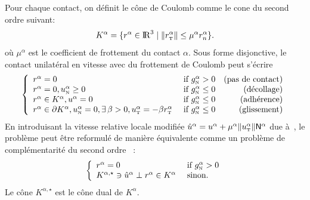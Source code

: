 \documentclass{CSMA2017}
\def\RR{\nbR}
\def\nbR{\ensuremath{\mathrm{I\!R}}} %
\def\n{{\hbox{\tiny{N}}}}
\def\t{{\hbox{\tiny{T}}}}
\begin{document}
Pour chaque contact, on définit le cône de Coulomb comme le cone du second ordre suivant:
\begin{equation}
  \label{eq:CoulombCone}
  K^\alpha = \{r^\alpha \in \RR^3 \mid \|r^\alpha_\t\| \leq \mu^\alpha r^\alpha_n\}.
\end{equation}
où $\mu^\alpha$ est le coefficient de frottement du contact $\alpha$. Sous forme disjonctive, le contact unilatéral en vitesse avec du frottement de Coulomb peut s'écrire
\begin{equation}
  \label{eq:contact-disjunctive}
  \left\{\begin{array}{llr}
      r^\alpha = 0  &\text{ if } g^\alpha_{\n} > 0  & \text{(pas de  contact)}\\
      r^\alpha = 0,  u^\alpha_\n \geq 0   &\text{ if } g^\alpha_{\n} \leq 0 & \text{(décollage)} \\
      r^\alpha \in K^\alpha, u^\alpha =0 &\text{ if } g^\alpha_{\n} \leq 0 & \text{(adhérence)}  \\
      r^\alpha \in \partial K^\alpha,u^\alpha _\n=0,  \exists\,\beta > 0, u^\alpha_\t = -\beta r^\alpha_\t &\text{ if } g^\alpha_{\n} \leq 0 & \text{(glissement)}  \\
    \end{array}\right.
\end{equation}
En introduisant la vitesse relative locale modifiée $\hat u^\alpha = u^\alpha + \mu^\alpha \|u^\alpha_\t\| {\sf N}^\alpha$ due à~\cite{DeSaxce92}, le problème peut être reformulé de manière équivalente comme un problème de complémentarité du second ordre~\cite{DeSaxce92,Acary.ea_ZAMM2011} :
\begin{equation}
  \label{eq:contact-soccp}
  \left\{\begin{array}{ll}
      r^\alpha = 0  & \text{ if } g^\alpha_{\n} > 0  \\
      K^{\alpha,\star}\ni \hat u^\alpha \perp r^\alpha \in K^\alpha  & \text{ sinon. }\\
    \end{array}\right.
\end{equation}
Le cône $K^{\alpha,\star}$ est le cône dual de $K^\alpha$.
\end{document}
